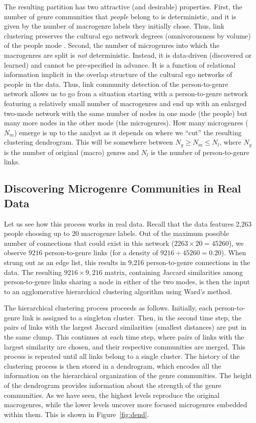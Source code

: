 \documentclass[a4paper,12pt]{extarticle}
\begin{document}
The resulting partition has two attractive (and desirable) properties. First, the number of genre communities that \textit{people} belong to is deterministic, and it is given by the number of macrogenre labels they initially chose. Thus, link clustering preserves the cultural ego network degrees (omnivorousness by volume) of the people mode \citep{lizardo14}. Second, the number of microgenres into which the macrogenres are split is {\em not} deterministic. Instead, it is data-driven (discovered or learned) and cannot be pre-specified in advance. It is a function of relational information implicit in the overlap structure of the cultural ego networks of people in the data. Thus, link community detection of the person-to-genre network allows us to go from a situation starting with a person-to-genre network featuring a relatively small number of macrogenres and end up with an enlarged two-mode network with the same number of nodes in one mode (the people) but many more nodes in the other mode (the microgenres). How many microgenres ($N_m$) emerge is up to the analyst as it depends on where we ``cut'' the resulting clustering dendrogram. This will be somewhere between $N_g \geq N_m \leq N_l$, where $N_g$ is the number of original (macro) genres and $N_l$ is the number of person-to-genre links.

\subsection{Discovering Microgenre Communities in Real Data}
Let us see how this process works in real data. Recall that the data features 2,263 people choosing up to 20 macrogenre labels. Out of the maximum possible number of connections that could exist in this network ($2263 \times 20 = 45260$), we observe $9216$ person-to-genre links (for a density of $9216 \div 45260 = 0.20$). When strung out as an edge list, this results in 9,216 person-to-genre connections in the data. The resulting $9216 \times 9,216$ matrix, containing Jaccard similarities among person-to-genre links sharing a node in either of the two modes, is then the input to an agglomerative hierarchical clustering algorithm using Ward's \citeyearpar{ward63} method. 

The hierarchical clustering process proceeds as follows. Initially, each person-to-genre link is assigned to a singleton cluster. Then, in the second time step, the pairs of links with the largest Jaccard similarities (smallest distances) are put in the same clump. This continues at each time step, where pairs of links with the largest similarity are chosen, and their respective communities are merged. This process is repeated until all links belong to a single cluster. The history of the clustering process is then stored in a dendrogram, which encodes all the information on the hierarchical organization of the genre communities. The height of the dendrogram provides information about the strength of the genre communities. As we have seen, the highest levels reproduce the original macrogenres, while the lower levels uncover more focused microgenres embedded within them. This is shown in Figure~\ref{fig:dend}. 
\end{document}
